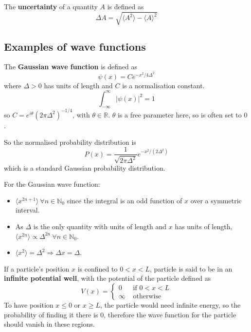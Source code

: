 \begin{definition}
	The \textbf{uncertainty} of a quantity $A$ is defined as
	\[
		\Delta A = \sqrt{\langle A^2 \rangle - \langle A \rangle ^2}
	\]
\end{definition}

\subsection{Examples of wave functions}

\begin{definition}
	The \textbf{Gaussian wave function} is defined as
	\[
		\psi(x) = C e^{-x^2 / 4 \Delta^2}
	\]
	where $\Delta > 0$ has units of length and $C$ is a normalisation constant.
	\[
		\int_{-\infty}^{\infty} |\psi(x)|^2 = 1
	\]
	so $C = e^{i \theta} {(2 \pi \Delta^2)}^{-1/4}$, with $\theta \in \mathbb{R}$. $\theta$ is a free parameter here, so is often set to $0$.

	So the normalised probability distribution is
	\[
		P(x) = \frac{1}{\sqrt{2 \pi \Delta^2}} e^{-x^2 / (2 \Delta^2)}
	\]
	which is a standard Gaussian probability distribution.
\end{definition}

\begin{remark}
	For the Gaussian wave function:
	\begin{itemize}
		\item $\langle x^{2n + 1} \rangle \ \forall n \in \mathbb{N}_0$ since the integral is an odd function of $x$ over a symmetric interval.
		\item As $\Delta$ is the only quantity with units of length and $x$ has units of length, $\langle x^{2n} \rangle \propto \Delta^{2n} \ \forall n \in \mathbb{N}_0$.
		\item $\langle x^2 \rangle = \Delta^2 \Longrightarrow \Delta x = \Delta$.
	\end{itemize}
\end{remark}

\begin{definition}
	If a particle's position $x$ is confined to $0 < x < L$, particle is said to be in an \textbf{infinite potential well}, with the potential of the particle defined as
	\[
		V(x) = \begin{cases}
			0 & \text{ if } 0 < x < L \\
			\infty & \text{ otherwise}
		\end{cases}
	\]
	To have position $x \le 0$ or $x \ge L$, the particle would need infinite energy, so the probability of finding it there is $0$, therefore the wave function for the particle should vanish in these regions.
\end{definition}

